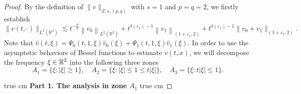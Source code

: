 \documentclass[11pt,twoside]{article}
\newcommand{\R}{\mathbb R}
\newcommand{\f}{\frac}
\theoremstyle{plain}
\theoremstyle{definition}
\theoremstyle{remark}
\numberwithin{equation}{section}
\begin{document}
\begin{proof}
By the definition of $\|v\|_{Z, s,(p, q)}$ with $s=1$ and $p=q=2$,
we firstly establish
\begin{equation}\label{equ:q18}
\|v(t, \cdot)\|_{L^2(\R^2)} \lesssim t^{-\f{\mu}{2}}\left\|v_0\right\|_{L^2(\R^2)}+t^{\delta(\varepsilon_1)-1}\left\|v_1\right\|_{(1+\varepsilon_1, 2)}+t^{\delta(\varepsilon_1)-1}\|v_0+v_1\|_{(1+\varepsilon_1, 2)}.
\end{equation}
Note that
$\hat{v}(t, \xi)=\Psi_{0}(t, 1, \xi) \hat{v}_{0}(\xi)+\Psi_{1}(t, 1, \xi) \hat{v}_{1}(\xi)$.
In order to use the asymptotic behaviors of Bessel functions to estimate $v(t, x)$,
we will decompose the frequency $\xi\in\Bbb R^2$  into the following three  zones
\begin{equation}\label{equ:q19}
A_1=\{\xi: |\xi|\ge 1\}, \quad A_2=\{\xi: |\xi| \leq 1 \leq t|\xi|\}, \quad A_3=\{\xi: t|\xi| \leq 1\}.
\end{equation}

 true cm
{\bf Part 1. The analysis in zone $A_1$}
 true cm


\end{proof}
\end{document}
